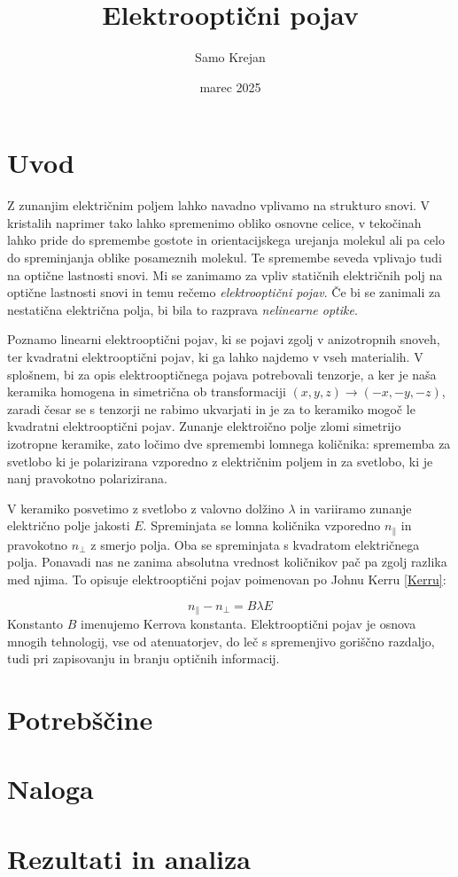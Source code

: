 \documentclass[12pt]{article}
\title{\textbf{Elektrooptični pojav}}
\author{Samo Krejan}
\date{marec 2025}
\begin{document}
\maketitle

\section{Uvod}

Z zunanjim električnim poljem lahko navadno vplivamo na strukturo snovi. V kristalih naprimer tako lahko spremenimo obliko osnovne celice, v tekočinah lahko pride do spremembe gostote in orientacijskega urejanja molekul ali pa celo do spreminjanja oblike posameznih molekul. Te spremembe seveda vplivajo tudi na optične lastnosti snovi. Mi se zanimamo za vpliv statičnih električnih polj na optične lastnosti snovi in temu rečemo \textit{elektrooptični pojav}. Če bi se zanimali za nestatična električna polja, bi bila to razprava \textit{nelinearne optike}.

Poznamo linearni elektrooptični pojav, ki se pojavi zgolj v anizotropnih snoveh, ter kvadratni elektrooptični pojav, ki ga lahko najdemo v vseh materialih. V splošnem, bi za opis elektrooptičnega pojava potrebovali tenzorje, a ker je naša keramika homogena in simetrična ob transformaciji $(x,y,z) \rightarrow (-x, -y,-z)$, zaradi česar se s tenzorji ne rabimo ukvarjati in je za to keramiko mogoč le kvadratni elektrooptični pojav. Zunanje elektroično polje zlomi simetrijo izotropne keramike, zato ločimo dve spremembi lomnega količnika: sprememba za svetlobo ki je polarizirana vzporedno z električnim poljem in za svetlobo, ki je nanj pravokotno polarizirana. 

V keramiko posvetimo z svetlobo z valovno dolžino $\lambda$ in variiramo zunanje električno polje jakosti $E$. Spreminjata se lomna količnika vzporedno $n_{\parallel}$ in pravokotno $n_{\perp}$ z smerjo polja. Oba se spreminjata s kvadratom električnega polja. Ponavadi nas ne zanima absolutna vrednost količnikov pač pa zgolj razlika med njima. To opisuje elektrooptični pojav poimenovan po Johnu Kerru \ref{Kerru}:

\begin{equation}
    n_{\parallel} - n_{\perp} = B\lambda E
    \label{Kerru}
\end{equation}
Konstanto $B$ imenujemo Kerrova konstanta. Elektrooptični pojav je osnova mnogih tehnologij, vse od atenuatorjev, do leč s spremenjivo goriščno razdaljo, tudi pri zapisovanju in branju optičnih informacij. 


\section{Potrebščine}


\section{Naloga}


\section{Rezultati in analiza}
\end{document}
